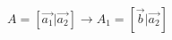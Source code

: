\documentclass[preview]{standalone}
\begin{document}
\begin{align*}
A = [\vec{a_1} | \vec{a_2}] \rightarrow A_1 = [\vec{b} | \vec{a_2}]
\end{align*}
\end{document}
